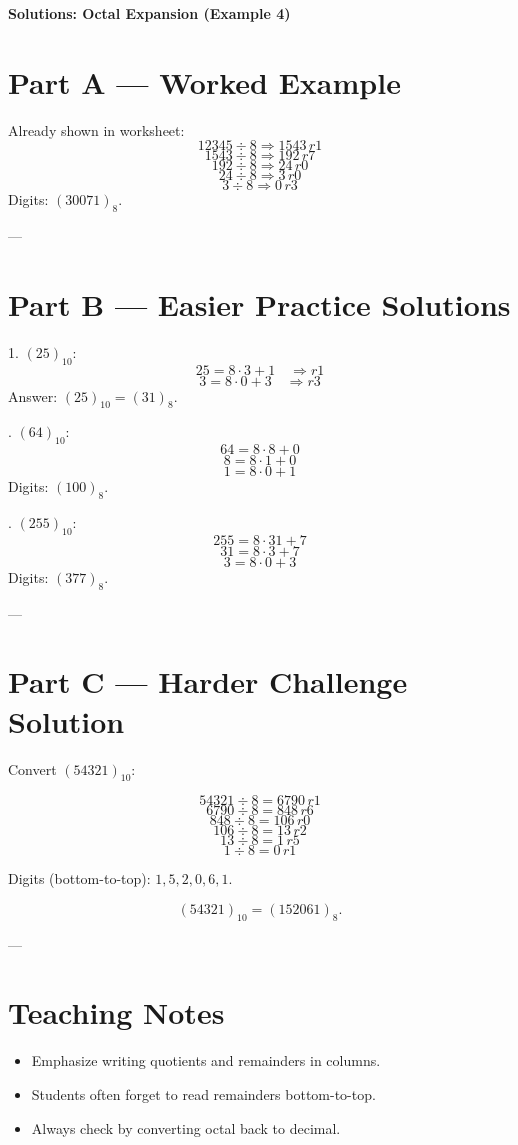 \documentclass[12pt]{article}
\begin{document}
\begin{center}
\Large\textbf{Solutions: Octal Expansion (Example 4)}
\end{center}

\section*{Part A — Worked Example}
Already shown in worksheet:
\[
12345 \div 8 \Rightarrow 1543 \, r1
\]
\[
1543 \div 8 \Rightarrow 192 \, r7
\]
\[
192 \div 8 \Rightarrow 24 \, r0
\]
\[
24 \div 8 \Rightarrow 3 \, r0
\]
\[
3 \div 8 \Rightarrow 0 \, r3
\]
Digits: $(30071)_8$.

---

\section*{Part B — Easier Practice Solutions}

1. $(25)_{10}$:
\[
25 = 8\cdot3 + 1 \quad \Rightarrow r1
\]
\[
3 = 8\cdot0 + 3 \quad \Rightarrow r3
\]
Answer: $(25)_{10} = (31)_{8}$.

. $(64)_{10}$:
\[
64 = 8\cdot8 + 0
\]
\[
8 = 8\cdot1 + 0
\]
\[
1 = 8\cdot0 + 1
\]
Digits: $(100)_{8}$.

. $(255)_{10}$:
\[
255 = 8\cdot31 + 7
\]
\[
31 = 8\cdot3 + 7
\]
\[
3 = 8\cdot0 + 3
\]
Digits: $(377)_{8}$.

---

\section*{Part C — Harder Challenge Solution}

Convert $(54321)_{10}$:

\[
54321 \div 8 = 6790 \, r1
\]
\[
6790 \div 8 = 848 \, r6
\]
\[
848 \div 8 = 106 \, r0
\]
\[
106 \div 8 = 13 \, r2
\]
\[
13 \div 8 = 1 \, r5
\]
\[
1 \div 8 = 0 \, r1
\]

Digits (bottom-to-top): $1,5,2,0,6,1$.

\[
(54321)_{10} = (152061)_{8}.
\]

---

\section*{Teaching Notes}
\begin{itemize}
  \item Emphasize writing quotients and remainders in columns.
  \item Students often forget to read remainders bottom-to-top.
  \item Always check by converting octal back to decimal.
\end{itemize}
\end{document}
